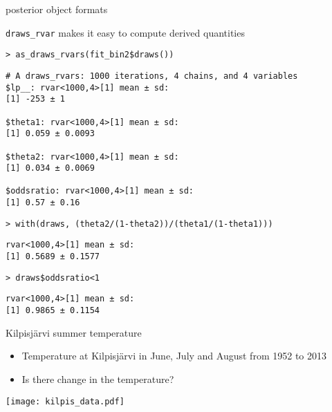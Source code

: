 \documentclass[finnish,english,t]{beamer}
\begin{document}
\begin{frame}[fragile]{posterior object formats}

 \vspace{-0.8\baselineskip}
  \texttt{draws\_rvar} makes it easy to compute derived quantities
  
{\scriptsize
    {
\begin{verbatim}
> as_draws_rvars(fit_bin2$draws())
\end{verbatim}
  \vspace{-\baselineskip}
\begin{verbatim}
# A draws_rvars: 1000 iterations, 4 chains, and 4 variables
$lp__: rvar<1000,4>[1] mean ± sd:
[1] -253 ± 1 

$theta1: rvar<1000,4>[1] mean ± sd:
[1] 0.059 ± 0.0093 

$theta2: rvar<1000,4>[1] mean ± sd:
[1] 0.034 ± 0.0069 

$oddsratio: rvar<1000,4>[1] mean ± sd:
[1] 0.57 ± 0.16
\end{verbatim}
  }
    \pause
    {
\begin{verbatim}
> with(draws, (theta2/(1-theta2))/(theta1/(1-theta1)))
\end{verbatim}
  \vspace{-\baselineskip}
\begin{verbatim}
rvar<1000,4>[1] mean ± sd:
[1] 0.5689 ± 0.1577 
\end{verbatim}
      }
    \pause
    {
\begin{verbatim}
> draws$oddsratio<1
\end{verbatim}
  \vspace{-\baselineskip}
\begin{verbatim}
rvar<1000,4>[1] mean ± sd:
[1] 0.9865 ± 0.1154 
\end{verbatim}
  }
}

\end{frame}


  

\begin{frame}{Kilpisjärvi summer temperature}
  
  \begin{itemize}
  \item Temperature at Kilpisjärvi in June, July and August from 1952 to 2013
  \item Is there change in the temperature?
  \end{itemize}
  \begin{center}
    \texttt{[image: kilpis\_data.pdf]}
  \end{center}
  
\end{frame}
\end{document}
